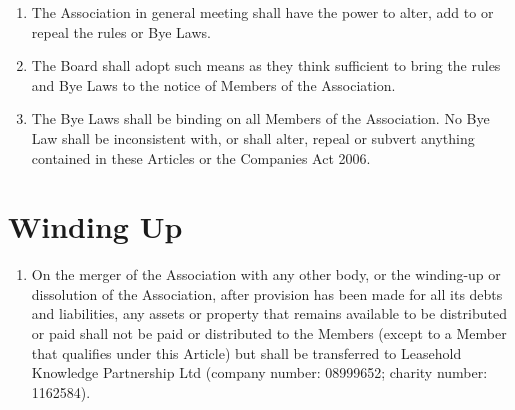 \documentclass[10pt]{mk-articles-of-association}
\newcommand{\mysection}[1]{
  \end{enumerate}
  \section*{#1}
  \begin{enumerate}[resume]
}
\newcommand{\EC}[0]{Board}
\newcommand{\Exec}[0]{\EC{} }
\newcommand{\LAFA}[0]{Leasehold and Freehold Abuses}
\begin{document}
\begin{enumerate}
\begin{enumerate}
\item the arrangements for the election or appointment of members of
  the \Exec by any Councils pursuant to
  ;

\item the conduct of Members of the Association in relation to one
  another, and to the Association's employees and volunteers;

\item the procedure at general meetings and meetings of the \Exec and
  the Councils in so far as such procedure is not regulated by the
  Companies Act or by these Articles;

\item the format and contents of the Register of \LAFA, such that
  it shall provide a general means of enumerating, identifying and
  discussing \LAFA{} both within and outside the Association; \ITand

\item generally, all such matters as are commonly the subject matter
  of company rules.

\end{enumerate}

\item The Association in general meeting shall have the power to
  alter, add to or repeal the rules or Bye Laws.

\item The \Exec shall adopt such means as they think sufficient to
  bring the rules and Bye Laws to the notice of Members of the Association.

\item The Bye Laws shall be binding on all Members of the
  Association. No Bye Law shall be inconsistent with, or shall
  alter, repeal or subvert anything contained in these Articles or
  the Companies Act 2006.


\mysection{Winding Up}

\item On the merger of the Association with any other body, or the
  winding-up or dissolution of the Association, after provision has
  been made for all its debts and liabilities, any assets or property
  that remains available to be distributed or paid shall not be paid
  or distributed to the Members (except to a Member that qualifies
  under this Article) but shall be transferred to Leasehold Knowledge
  Partnership Ltd (company number: 08999652; charity number: 1162584).
\end{enumerate}
\end{document}
